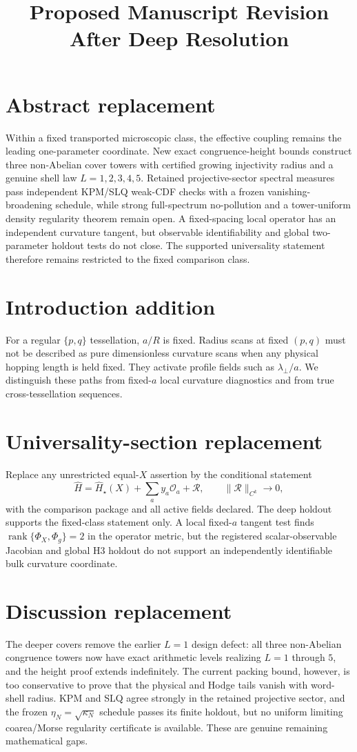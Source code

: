 \documentclass[11pt]{article}
\title{Proposed Manuscript Revision After Deep Resolution}
\date{}
\begin{document}
\maketitle
\section*{Abstract replacement}
Within a fixed transported microscopic class, the effective coupling remains
the leading one-parameter coordinate.  New exact congruence-height bounds
construct three non-Abelian cover towers with certified growing injectivity
radius and a genuine shell law $L=1,2,3,4,5$.  Retained projective-sector
spectral measures pass independent KPM/SLQ weak-CDF checks with a frozen
vanishing-broadening schedule, while strong full-spectrum no-pollution and a
tower-uniform density regularity theorem remain open.  A fixed-spacing local
operator has an independent curvature tangent, but observable identifiability
and global two-parameter holdout tests do not close.  The supported
universality statement therefore remains restricted to the fixed comparison
class.

\section*{Introduction addition}
For a regular $\{p,q\}$ tessellation, $a/R$ is fixed.  Radius scans at fixed
$(p,q)$ must not be described as pure dimensionless curvature scans when any
physical hopping length is held fixed.  They activate profile fields such as
$\lambda_\perp/a$.  We distinguish these paths from fixed-$a$ local curvature
diagnostics and from true cross-tessellation sequences.

\section*{Universality-section replacement}
Replace any unrestricted equal-$X$ assertion by the conditional statement
\[
 \widehat H=\widehat H_\star(X)+\sum_a y_a\mathcal O_a+\mathcal R,
 \qquad \|\mathcal R\|_{C^k}\to0,
\]
with the comparison package and all active fields declared.  The deep
holdout supports the fixed-class statement only.  A local fixed-$a$ tangent
test finds $\operatorname{rank}\{\Phi_X,\Phi_g\}=2$ in the operator metric,
but the registered scalar-observable Jacobian and global H3 holdout do not
support an independently identifiable bulk curvature coordinate.

\section*{Discussion replacement}
The deeper covers remove the earlier $L=1$ design defect: all three
non-Abelian congruence towers now have exact arithmetic levels realizing
$L=1$ through $5$, and the height proof extends indefinitely.  The current
packing bound, however, is too conservative to prove that the physical and
Hodge tails vanish with word-shell radius.  KPM and SLQ agree strongly in the
retained projective sector, and the frozen $\eta_N=\sqrt{\kappa_N}$ schedule
passes its finite holdout, but no uniform limiting coarea/Morse regularity
certificate is available.  These are genuine remaining mathematical gaps.
\end{document}
